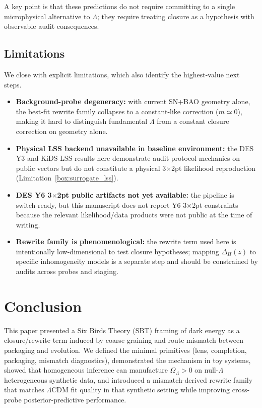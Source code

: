 \documentclass[11pt]{article}
\theoremstyle{definition}
\theoremstyle{plain}
\theoremstyle{remark}
\newcounter{limitation}[section]
\begin{document}
A key point is that these predictions do not require committing to a single microphysical alternative to $\Lambda$; they require treating closure as a hypothesis with observable audit consequences.

\subsection{Limitations}\label{sec:discussion:limitations}
We close with explicit limitations, which also identify the highest-value next steps.

\begin{itemize}
  \item \textbf{Background-probe degeneracy:} with current SN+BAO geometry alone, the best-fit rewrite family collapses to a constant-like correction ($m\simeq 0$), making it hard to distinguish fundamental $\Lambda$ from a constant closure correction on geometry alone.
  \item \textbf{Physical LSS backend unavailable in baseline environment:} the DES Y3 and KiDS LSS results here demonstrate audit protocol mechanics on public vectors but do not constitute a physical 3$\times$2pt likelihood reproduction (Limitation~\ref{box:surrogate_lss}).
  \item \textbf{DES Y6 3$\times$2pt public artifacts not yet available:} the pipeline is switch-ready, but this manuscript does not report Y6 3$\times$2pt constraints because the relevant likelihood/data products were not public at the time of writing.
  \item \textbf{Rewrite family is phenomenological:} the rewrite term used here is intentionally low-dimensional to test closure hypotheses; mapping $\Delta_H(z)$ to specific inhomogeneity models is a separate step and should be constrained by audits across probes and staging.
\end{itemize}

\section{Conclusion}\label{sec:conclusion}
This paper presented a Six Birds Theory (SBT) framing of dark energy as a closure/rewrite term induced by coarse-graining and route mismatch between packaging and evolution. We defined the minimal primitives (lens, completion, packaging, mismatch diagnostics), demonstrated the mechanism in toy systems, showed that homogeneous inference can manufacture $\Omega_\Lambda>0$ on null-$\Lambda$ heterogeneous synthetic data, and introduced a mismatch-derived rewrite family that matches $\Lambda$CDM fit quality in that synthetic setting while improving cross-probe posterior-predictive performance.
\end{document}
